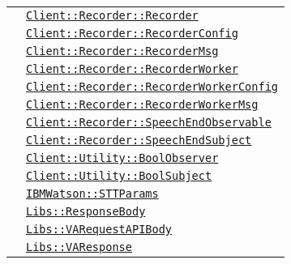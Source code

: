 \begin{longtable}{|>{\centering}m{3cm}|m{10cm}<{\centering}|}
& \hyperref[Client::Recorder::Recorder]{\texttt{Client::Recorder::Recorder}}\\
& \hyperref[Client::Recorder::RecorderConfig]{\texttt{Client::Recorder::RecorderConfig}}\\
& \hyperref[Client::Recorder::RecorderMsg]{\texttt{Client::Recorder::RecorderMsg}}\\
& \hyperref[Client::Recorder::RecorderWorker]{\texttt{Client::Recorder::RecorderWorker}}\\
& \hyperref[Client::Recorder::RecorderWorkerConfig]{\texttt{Client::Recorder::RecorderWorkerConfig}}\\
& \hyperref[Client::Recorder::RecorderWorkerMsg]{\texttt{Client::Recorder::RecorderWorkerMsg}}\\
& \hyperref[Client::Recorder::SpeechEndObservable]{\texttt{Client::Recorder::SpeechEndObservable}}\\
& \hyperref[Client::Recorder::SpeechEndSubject]{\texttt{Client::Recorder::SpeechEndSubject}}\\
& \hyperref[Client::Utility::BoolObserver]{\texttt{Client::Utility::BoolObserver}}\\
& \hyperref[Client::Utility::BoolSubject]{\texttt{Client::Utility::BoolSubject}}\\
& \hyperref[IBMWatson::STTParams]{\texttt{IBMWatson::STTParams}}\\
& \hyperref[Libs::ResponseBody]{\texttt{Libs::ResponseBody}}\\
& \hyperref[Libs::VARequestAPIBody]{\texttt{Libs::VARequestAPIBody}}\\
& \hyperref[Libs::VAResponse]{\texttt{Libs::VAResponse}}\\ \hline


\end{longtable}
